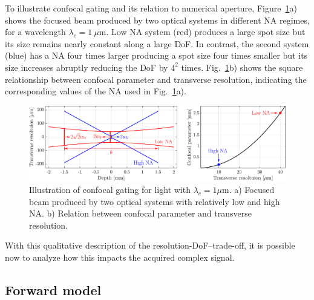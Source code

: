 To illustrate confocal gating and its relation to numerical aperture, Figure~\ref{fig:ConfocalScan}a) shows the focused beam produced by two optical systems in different NA regimes, for a wavelength $\lambda_c = 1~\mu$m. Low NA system (red) produces a large spot size but its size remains nearly constant along a large DoF. In contrast, the second system (blue) has a NA four times larger producing a spot size four times smaller but its size increases abruptly reducing the DoF by $4^2$ times. Fig.~\ref{fig:ConfocalScan}b) shows the square relationship between confocal parameter and transverse resolution, indicating the corresponding values of the NA used in Fig.~\ref{fig:ConfocalScan}a).

\begin{figure}[htb!]
    \centering
    \includegraphics[width=\textwidth]{Figures/TheoreticalBasis/ConfocalScan.pdf}
    \caption{Illustration of confocal gating for light with $\lambda_c = 1\mu$m. a) Focused beam produced by two optical systems with relatively low and high NA. b) Relation between confocal parameter and transverse resolution.}
    \label{fig:ConfocalScan}
\end{figure}

With this qualitative description of the resolution-DoF--trade-off, it is possible now to analyze how this impacts the acquired complex signal.

\subsection{Forward model}

